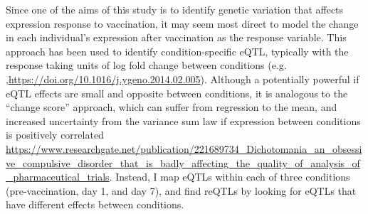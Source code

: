 Since one of the aims of this study is to identify genetic variation that affects expression response to vaccination, it may seem most direct to model the change in each individual's expression after vaccination as the response variable.
This approach has been used to identify condition-specific \gls{eQTL}, typically with the response taking units of log fold change between conditions (e.g. \autocite{maranville2011InteractionsGlucocorticoidTreatment,ackermann2013ImpactNaturalGenetic},\url{https://doi.org/10.1016/j.ygeno.2014.02.005}).
Although a potentially powerful if \gls{eQTL} effects are small and opposite between conditions\autocite{ackermann2013ImpactNaturalGenetic}, it is analogous to the \enquote{change score} approach, which can suffer from regression to the mean, and increased uncertainty from the variance sum law if expression between conditions is positively correlated\autocite{allison1990ChangeScoresDependent,ackermann2013ImpactNaturalGenetic,clifton2019CorrelationBaselineScore} \url{https://www.researchgate.net/publication/221689734_Dichotomania_an_obsessive_compulsive_disorder_that_is_badly_affecting_the_quality_of_analysis_of_pharmaceutical_trials}.
Instead, I map \glspl{eQTL} within each of three conditions (pre-vaccination, day 1, and day 7), and find \glspl{reQTL} by looking for \glspl{eQTL} that have different effects between conditions.

